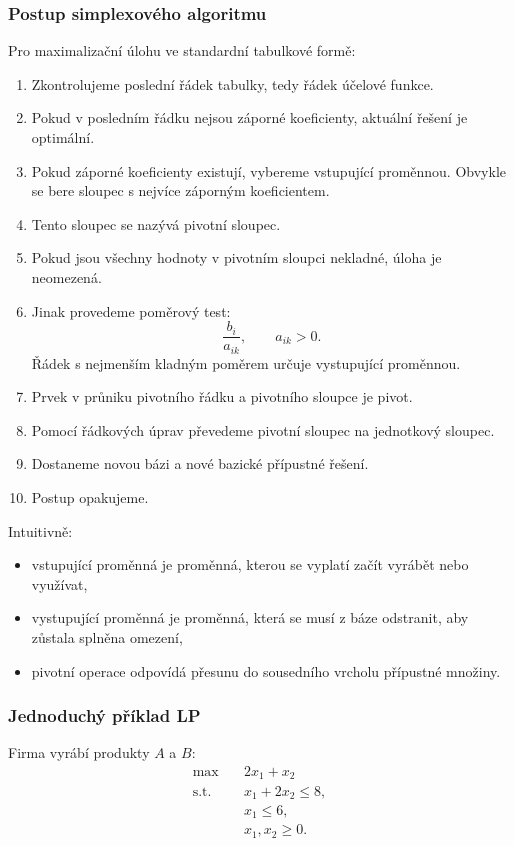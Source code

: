 \subsubsection{Postup simplexového algoritmu}

Pro maximalizační úlohu ve standardní tabulkové formě:

\begin{enumerate}
    \item Zkontrolujeme poslední řádek tabulky, tedy řádek účelové funkce.
    \item Pokud v posledním řádku nejsou záporné koeficienty, aktuální řešení je optimální.
    \item Pokud záporné koeficienty existují, vybereme vstupující proměnnou. Obvykle se bere sloupec
    s nejvíce záporným koeficientem.
    \item Tento sloupec se nazývá pivotní sloupec.
    \item Pokud jsou všechny hodnoty v pivotním sloupci nekladné, úloha je neomezená.
    \item Jinak provedeme poměrový test:
    \[
    \frac{b_i}{a_{ik}},\qquad a_{ik}>0.
    \]
    Řádek s nejmenším kladným poměrem určuje vystupující proměnnou.
    \item Prvek v průniku pivotního řádku a pivotního sloupce je pivot.
    \item Pomocí řádkových úprav převedeme pivotní sloupec na jednotkový sloupec.
    \item Dostaneme novou bázi a nové bazické přípustné řešení.
    \item Postup opakujeme.
\end{enumerate}

Intuitivně:
\begin{itemize}
    \item vstupující proměnná je proměnná, kterou se vyplatí začít vyrábět nebo využívat,
    \item vystupující proměnná je proměnná, která se musí z báze odstranit, aby zůstala splněna omezení,
    \item pivotní operace odpovídá přesunu do sousedního vrcholu přípustné množiny.
\end{itemize}

\subsubsection{Jednoduchý příklad LP}

Firma vyrábí produkty $A$ a $B$:
\[
\begin{aligned}
\max \quad & 2x_1+x_2\\
\text{s.t.}\quad & x_1+2x_2\le 8,\\
& x_1\le 6,\\
& x_1,x_2\ge 0.
\end{aligned}
\]

